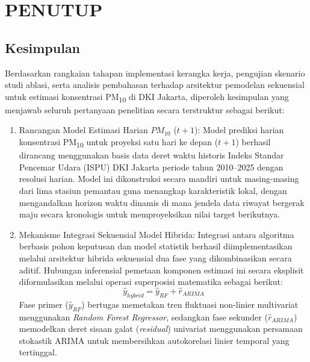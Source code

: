 \cleardoublepage
\chapter{PENUTUP}
\label{chap:penutup}

\section{Kesimpulan}
Berdasarkan rangkaian tahapan implementasi kerangka kerja, pengujian skenario studi ablasi, serta analisis pembahasan terhadap arsitektur pemodelan sekuensial untuk estimasi konsentrasi PM\textsubscript{10} di DKI Jakarta, diperoleh kesimpulan yang menjawab seluruh pertanyaan penelitian secara terstruktur sebagai berikut:

\begin{enumerate}
    \item {Rancangan Model Estimasi Harian $PM_{10}$ ($t+1$):} Model prediksi harian konsentrasi PM\textsubscript{10} untuk proyeksi satu hari ke depan ($t+1$) berhasil dirancang menggunakan basis data deret waktu historis Indeks Standar Pencemar Udara (ISPU) DKI Jakarta periode tahun 2010--2025 dengan resolusi harian. Model ini dikonstruksi secara mandiri untuk masing-masing dari lima stasiun pemantau guna menangkap karakteristik lokal, dengan mengandalkan horizon waktu dinamis di mana jendela data riwayat bergerak maju secara kronologis untuk memproyeksikan nilai target berikutnya.
    
    \item {Mekanisme Integrasi Sekuensial Model Hibrida:} Integrasi antara algoritma berbasis pohon keputusan dan model statistik berhasil diimplementasikan melalui arsitektur hibrida sekuensial dua fase yang dikombinasikan secara aditif. Hubungan inferensial pemetaan komponen estimasi ini secara eksplisit diformulasikan melalui operasi superposisi matematika sebagai berikut:
    \begin{equation}
        \hat{y}_{hybrid} = \hat{y}_{RF} + \hat{r}_{ARIMA}
    \end{equation}
    Fase primer ($\hat{y}_{RF}$) bertugas memetakan tren fluktuasi non-linier multivariat menggunakan \textit{Random Forest Regressor}, sedangkan fase sekunder ($\hat{r}_{ARIMA}$) memodelkan deret sisaan galat (\textit{residual}) univariat menggunakan persamaan stokastik ARIMA untuk membersihkan autokorelasi linier temporal yang tertinggal. 


\end{enumerate}
